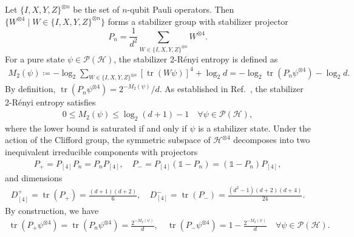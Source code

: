 \documentclass[aps,pra,twocolumn,nofootinbib,superscriptaddress,10pt]{revtex4-2}
\DeclareMathOperator{\tr}{tr}
\newcommand{\bbone}{\mathds{1}}
\newcommand{\caH}{\mathcal{H}}
\newcommand{\caP}{\mathcal{P}}
\newcommand{\rcite}[1]{Ref.~\cite{#1}}
\begin{document}
Let $\{I,X,Y,Z\}^{\otimes n}$ be the set of $n$-qubit Pauli operators. Then $\{W^{\otimes 4}\mid W\in \{I,X,Y,Z\}^{\otimes n}\}$ forms a stabilizer group with stabilizer projector
\begin{equation}
  P_n=\frac{1}{d^2}\sum_{W\in \{I,X,Y,Z\}^{\otimes n}} W^{\otimes 4}.
\end{equation}
For a pure state $\psi \in \caP(\caH)$, the stabilizer 2-R\'enyi entropy \cite{Leone22} is defined as
\begin{align}
   M_2(\psi)\coloneqq-\log_2\sum_{W\in\{I,X,Y,Z\}^{\otimes n}}\left[\tr(W\psi)\right]^4+\log_2 d = -\log_2\tr\left(P_n\psi^{\otimes 4}\right)-\log_2 d.
\end{align}
By definition, $\tr\left(P_n\psi^{\otimes 4}\right)=2^{-M_2(\psi)}/d$. As established in \rcite{Zhu16}, the stabilizer 2-R\'enyi entropy satisfies
\begin{align}
      0\le M_2(\psi)\le \log_2(d+1)-1 \quad \forall \psi\in \caP(\caH), \label{eq:stab_bound}
\end{align}
where the lower bound is saturated if and only if $\psi$ is a stabilizer state. Under the action of the Clifford group, the symmetric subspace of $\caH^{\otimes 4}$ decomposes into two inequivalent irreducible components with projectors
\begin{align}
P_+=P_{[4]}P_n=P_nP_{[4]},\quad P_-=P_{[4]}(\bbone-P_n)=(\bbone-P_n)P_{[4]},
\end{align}
and dimensions
\begin{align}
  D^{+}_{[4]}=\tr(P_+)=\frac{(d+1)(d+2)}{6},\quad  D^{-}_{[4]}=\tr(P_-)=\frac{(d^2-1)(d+2)(d+4)}{24}. \label{eq:D4pm}
\end{align}
By construction, we have
\begin{align}
\tr\left(P_+\psi^{\otimes 4}\right)=\tr\left(P_n\psi^{\otimes 4}\right)=\frac{2^{-M_2(\psi)}}{d},\quad \tr\left(P_-\psi^{\otimes 4}\right)=1-\frac{2^{-M_2(\psi)}}{d}\quad \forall \psi\in \caP(\caH). \label{eq:PpPmProb}
\end{align}
\end{document}
